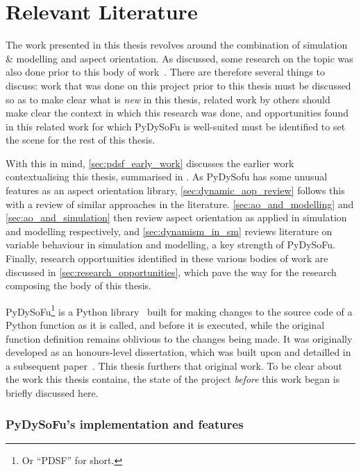 \chapter{Relevant Literature}

The work presented in this thesis revolves around the combination of simulation
\& modelling and aspect orientation. As discussed, some research on the topic
was also done prior to this body of work~. There are therefore several things to discuss: work that
was done on this project prior to this thesis must be discussed so as to make
clear what is \emph{new} in this thesis, related work by others should make
clear the context in which this research was done, and opportunities found in
this related work for which PyDySoFu is well-suited must be identified to set
the scene for the rest of this thesis.

With this in mind, \cref{sec:pdsf_early_work} discusses the earlier work contextualising this
thesis, summarised in \cite{wallis2018caise}. As PyDySofu has some unusual
features as an aspect orientation library, \cref{sec:dynamic_aop_review} follows
this with a review of similar approaches in the literature.
\cref{sec:ao_and_modelling} and \cref{sec:ao_and_simulation} then review aspect
orientation as applied in simulation and modelling respectively, and
\cref{sec:dynamism_in_sm} reviews literature on variable behaviour in simulation
and modelling, a key strength of PyDySoFu. Finally, research opportunities
identified in these various bodies of work are discussed in
\cref{sec:research_opportunities}, which pave the way for the research composing
the body of this thesis.





PyDySoFu\footnote{Or ``PDSF'' for short.} is a Python library~\cite{pdsf_repo}
built for making changes to the source code of a Python function as it is
called, and before it is executed, while the original function definition
remains oblivious to the changes being made. It was originally developed as an
honours-level dissertation, which was built upon and detailled in a subsequent
paper~\cite{wallis2018caise}. This thesis furthers that original work. To be
clear about the work this thesis contains, the state of the project
\emph{before} this work began is briefly discussed here.

\subsection{PyDySoFu's implementation and features}


